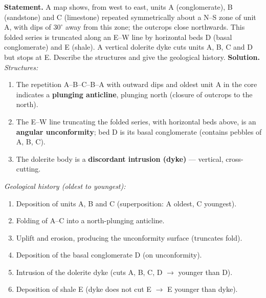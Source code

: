 \documentclass[11pt]{article}
\begin{document}
\begin{exoresolu}
\textbf{Statement.} A map shows, from west to east, units A (conglomerate), B (sandstone) and C (limestone) repeated symmetrically about a N--S zone of unit A, with dips of $30^{\circ}$ away from this zone; the outcrops close northwards. This folded series is truncated along an E--W line by horizontal beds D (basal conglomerate) and E (shale). A vertical dolerite dyke cuts units A, B, C and D but stops at E. Describe the structures and give the geological history.
\tcblower
\textbf{Solution.} 
\emph{Structures:} 
\begin{enumerate}
\item The repetition A--B--C--B--A with outward dips and oldest unit A in the core indicates a \textbf{plunging anticline}, plunging north (closure of outcrops to the north).
\item The E--W line truncating the folded series, with horizontal beds above, is an \textbf{angular unconformity}; bed D is its basal conglomerate (contains pebbles of A, B, C).
\item The dolerite body is a \textbf{discordant intrusion (dyke)} — vertical, cross-cutting.
\end{enumerate}
\emph{Geological history (oldest to youngest):}
\begin{enumerate}
\item Deposition of units A, B and C (superposition: A oldest, C youngest).
\item Folding of A--C into a north-plunging anticline.
\item Uplift and erosion, producing the unconformity surface (truncates fold).
\item Deposition of the basal conglomerate D (on unconformity).
\item Intrusion of the dolerite dyke (cuts A, B, C, D $\rightarrow$ younger than D).
\item Deposition of shale E (dyke does not cut E $\rightarrow$ E younger than dyke).
\end{enumerate}
\end{exoresolu}
\end{document}
